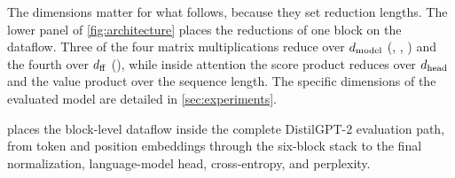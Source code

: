 The dimensions matter for what follows, because they set reduction lengths. The lower panel of \cref{fig:architecture} places the reductions of one block on the dataflow. Three of the four matrix
multiplications reduce over $d_{\rm model}$ (,
, ) and the fourth over
$d_{\rm ff}$ (), while inside attention the score
product reduces over $d_{\rm head}$ and the value product over the
sequence length. The specific dimensions of the evaluated model are detailed in \cref{sec:experiments}.

 places the block-level dataflow inside the complete DistilGPT-2 evaluation path, from token and
position embeddings through the six-block stack to the final normalization,
language-model head, cross-entropy, and perplexity.


